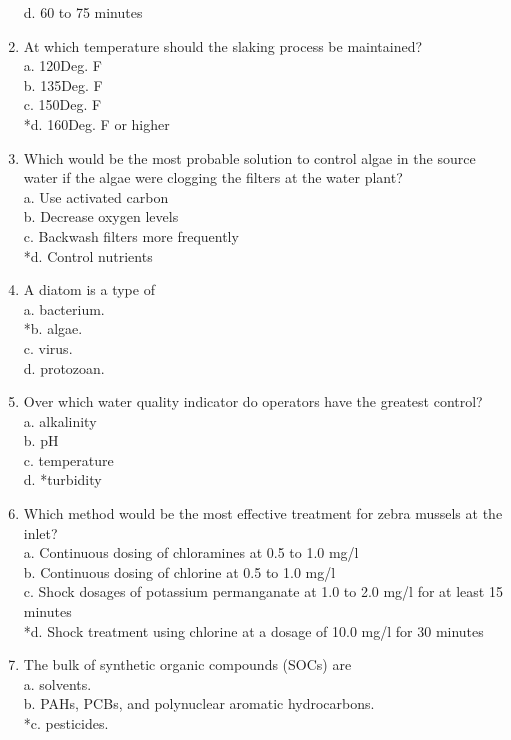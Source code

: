 \begin{enumerate}
d. 60 to 75 minutes\\
\item At which temperature should the slaking process be maintained?\\
a. 120Deg. F\\
b. 135Deg. F\\
c. 150Deg. F\\
*d. 160Deg. F or higher\\
\item Which would be the most probable solution to control algae in the source water if the algae were clogging the filters at the water plant?\\
a. Use activated carbon\\
b. Decrease oxygen levels\\
c. Backwash filters more frequently\\
*d. Control nutrients\\
\item A diatom is a type of\\
a. bacterium.\\
*b. algae.\\
c. virus.\\
d. protozoan.\\
\item Over which water quality indicator do operators have the greatest control?\\
a. alkalinity\\
b. $\mathrm{pH}$\\
c. temperature\\
d. *turbidity\\
\item Which method would be the most effective treatment for zebra mussels at the inlet?\\
a. Continuous dosing of chloramines at 0.5 to 1.0 mg/l\\
b. Continuous dosing of chlorine at 0.5 to 1.0 mg/l\\
c. Shock dosages of potassium permanganate at 1.0 to 2.0 mg/l for at least 15 minutes\\
*d. Shock treatment using chlorine at a dosage of 10.0 mg/l for 30 minutes\\
\item The bulk of synthetic organic compounds (SOCs) are\\
a. solvents.\\
b. PAHs, PCBs, and polynuclear aromatic hydrocarbons.\\
*c. pesticides.\\

\end{enumerate}
